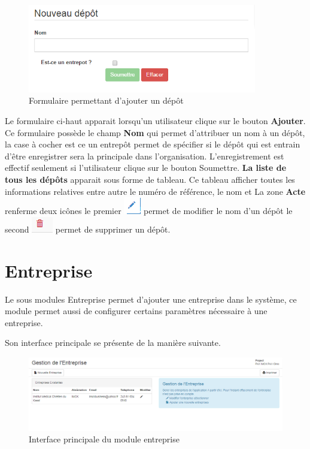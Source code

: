 \documentclass[12pt,a4paper]{report}
\begin{document}
\begin{figure}[h]
\begin{center}
\includegraphics[width=10cm]{pic/NewStore.png}
\end{center}
\caption{Formulaire permettant d'ajouter un dépôt}
\label{Formulaire permettant d'ajouter un dépôt}
\end{figure}

Le formulaire ci-haut apparait lorsqu'un utilisateur clique sur le bouton \textbf{Ajouter}. Ce formulaire possède le champ \textbf{Nom} qui permet d'attribuer un nom à un dépôt, la case à cocher est ce un entrepôt permet de spécifier si le dépôt qui est entrain d'être enregistrer sera la principale dans l'organisation.
L'enregistrement est effectif seulement si l'utilisateur clique sur le bouton Soumettre. \textbf{La liste de tous les dépôts} apparait sous forme de tableau. Ce tableau afficher toutes les informations relatives entre autre le numéro de référence, le nom et La zone \textbf{Acte} renferme deux icônes le premier \includegraphics[scale=0.7]{pic/EditUser.png}  permet de modifier le nom d'un dépôt le second \includegraphics[scale=0.7]{pic/DeleteWRed.png}  permet de supprimer un dépôt.

\newpage
\section{Entreprise}
Le sous modules Entreprise permet d'ajouter une entreprise dans le système, ce module permet aussi de configurer certains paramètres nécessaire à une entreprise.

Son interface principale se présente de la manière suivante.

\begin{figure}[h]
\begin{center}
\includegraphics[width=14cm]{pic/ModuleEntreprise.png}
\end{center}
\caption{Interface principale du module entreprise}
\label{Interface principale du module entreprise}
\end{figure} 
\end{document}
